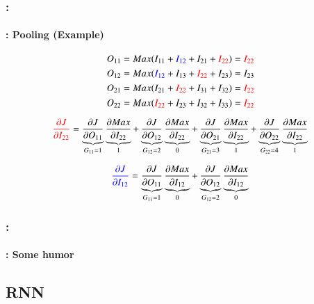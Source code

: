 \documentclass[xcolor=table]{beamer}
\begin{document}
\begin{frame}
	\frametitle{\insertshortsubtitle: \insertsection}
	\framesubtitle{\insertsubsection: Pooling (Example)}
	
	\begin{center}
		\vskip-6pt
	\end{center}\vskip-16pt
	
	{\scriptsize 
		\[O_{11} = Max(I_{11} + \textcolor{blue}{I_{12}} + I_{21} + \textcolor{red}{I_{22}}) = \textcolor{red}{I_{22}}  \]
		\[O_{12} = Max(\textcolor{blue}{I_{12}} + I_{13} + \textcolor{red}{I_{22}} + I_{23}) = I_{23}  \]
		\[O_{21} = Max(I_{21} + \textcolor{red}{I_{22}} + I_{31} + I_{32}) = \textcolor{red}{I_{22}} \]
		\[O_{22} = Max(\textcolor{red}{I_{22}} + I_{23} + I_{32} + I_{33}) = \textcolor{red}{I_{22}}  \]
		
		\[\textcolor{red}{\frac{\partial J}{\partial I_{22}}} 
		= \underbrace{\frac{\partial J}{\partial O_{11}}}_{G_{11} = 1} 
		\underbrace{\frac{\partial Max}{\partial I_{22}}}_{1}
		+ \underbrace{\frac{\partial J}{\partial O_{12}}}_{G_{12} = 2} 
		\underbrace{\frac{\partial Max}{\partial I_{22}}}_{0}
		+ \underbrace{\frac{\partial J}{\partial O_{21}}}_{G_{21} = 3} 
		\underbrace{\frac{\partial Max}{\partial I_{22}}}_{1}
		+ \underbrace{\frac{\partial J}{\partial O_{22}}}_{G_{22} = 4} 
		\underbrace{\frac{\partial Max}{\partial I_{22}}}_{1}\]
		
		\[\textcolor{blue}{\frac{\partial J}{\partial I_{12}}} 
		= \underbrace{\frac{\partial J}{\partial O_{11}}}_{G_{11} = 1} 
		\underbrace{\frac{\partial Max}{\partial I_{12}}}_{0}
		+ \underbrace{\frac{\partial J}{\partial O_{12}}}_{G_{12} = 2} 
		\underbrace{\frac{\partial Max}{\partial I_{12}}}_{0}\]
	}
	
\end{frame}

\begin{frame}
	\frametitle{\insertshortsubtitle: \insertsection}
	\framesubtitle{\insertsubsection: Some humor}
	
	
\end{frame}

\subsection{RNN}
\end{document}
